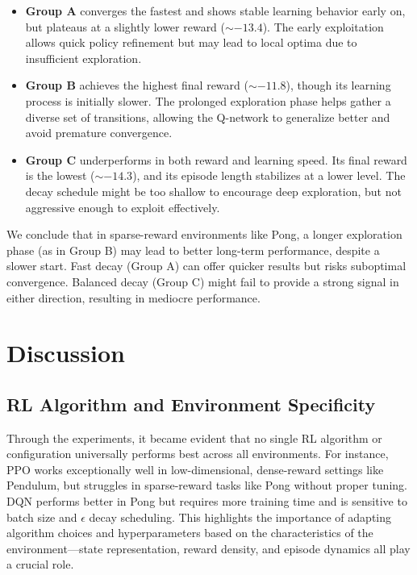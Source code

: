 \documentclass[10pt,twocolumn,letterpaper]{article}
\begin{document}
\begin{itemize}
  \item \textbf{Group A} converges the fastest and shows stable learning behavior early on, but plateaus at a slightly lower reward ($\sim -13.4$). The early exploitation allows quick policy refinement but may lead to local optima due to insufficient exploration.
  
  \item \textbf{Group B} achieves the highest final reward ($\sim -11.8$), though its learning process is initially slower. The prolonged exploration phase helps gather a diverse set of transitions, allowing the Q-network to generalize better and avoid premature convergence.
  
  \item \textbf{Group C} underperforms in both reward and learning speed. Its final reward is the lowest ($\sim -14.3$), and its episode length stabilizes at a lower level. The decay schedule might be too shallow to encourage deep exploration, but not aggressive enough to exploit effectively.
\end{itemize}

We conclude that in sparse-reward environments like Pong, a longer exploration phase (as in Group B) may lead to better long-term performance, despite a slower start. Fast decay (Group A) can offer quicker results but risks suboptimal convergence. Balanced decay (Group C) might fail to provide a strong signal in either direction, resulting in mediocre performance.



\section{Discussion}
\label{sec:discussion}

\subsection{RL Algorithm and Environment Specificity}

Through the experiments, it became evident that no single RL algorithm or configuration universally performs best across all environments. For instance, PPO works exceptionally well in low-dimensional, dense-reward settings like Pendulum, but struggles in sparse-reward tasks like Pong without proper tuning. DQN performs better in Pong but requires more training time and is sensitive to batch size and $\epsilon$ decay scheduling. This highlights the importance of adapting algorithm choices and hyperparameters based on the characteristics of the environment—state representation, reward density, and episode dynamics all play a crucial role.
\end{document}
